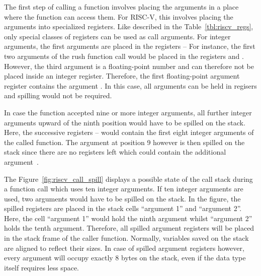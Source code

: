 The first step of calling a function involves placing the arguments in a place where the function can access them.
For RISC-V, this involves placing the arguments into specialized registers.
Like described in the Table~\ref{tbl:riscv_regs}, only special classes of registers can be used as call arguments.
For integer arguments, the first arguments are placed in the registers --
For instance, the first two arguments of the rush function call
 would be placed in the registers  and .
However, the third argument is a floating-point number and can therefore not be placed inside an integer register.
Therefore, the first floating-point argument register  contains the argument .
In this case, all arguments can be held in regisers and spilling would not be required.

In case the function accepted nine or more integer arguments,
all further integer arguments upward of the ninth position would have to be spilled on the stack.
Here, the successive registers -- would contain the first eight integer arguments of the called function.
The argument at position 9 however is then spilled on the stack since there are no registers left which could contain the additional argument~\cite[p~.8]{RiscvABI2022}.

The Figure~\ref{fig:riscv_call_spill} displays a possible state of the call stack during a function call which uses ten integer arguments.
If ten integer arguments are used, two arguments would have to be spilled on the stack.
In the figure, the spilled registers are placed in the stack cells \enquote{argument 1} and \enquote{argument 2}.
Here, the cell \enquote{argument 1} would hold the ninth argument whilst \enquote{argument 2} holds the tenth argument.
Therefore, all spilled argument registers will be placed in the stack frame of the caller function.
Normally, variables saved on the stack are aligned to reflect their sizes.
In case of spilled argument registers however, every argument will occupy exactly 8 bytes on the stack, even if the data type itself requires less space.

